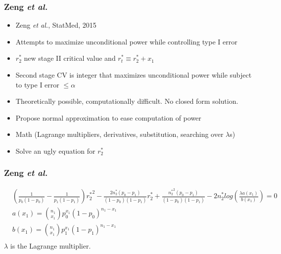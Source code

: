 \documentclass{beamer}\usepackage[]{graphicx}\usepackage[]{color}
\begin{document}
\begin{frame}
\frametitle{Zeng \textit{et al.}}
    \begin{itemize}
        \item Zeng \textit{et al.}, StatMed, 2015
        \item Attempts to maximize unconditional power while controlling type I error %
        \item $r_2^\ast$ new stage II critical value and $r_t^\ast \equiv r_2^\ast + x_1$ %
        \item Second stage CV is integer that maximizes unconditional power while subject to type I error $\leq \alpha$
        \item Theoretically possible, computationally difficult. No closed form solution.
        \item Propose normal approximation to ease computation of power
        \item Math (Lagrange multipliers, derivatives, substitution, searching over $\lambda$s)
        \item Solve an ugly equation for $r_2^\ast$
    \end{itemize}
\end{frame}

\begin{frame}
\frametitle{Zeng \textit{et al.}}
\tiny
\begin{equation}
\begin{aligned}
& \left(\frac{1}{p_0(1-p_0)} - \frac{1}{p_1(1-p_1)} \right) {r_2^\ast}^2 - \frac{2 n_2^\ast (p_0 - p_1)}{(1-p_0)(1-p_1)}r_2^\ast + \frac{{n_2^\ast}^2(p_0-p_1)}{(1-p_0)(1-p_1)}-2n_2^\ast log \left(\frac{\lambda a(x_1)}{b(x_1)}\right) = 0 \\
& a(x_1) = {n_1 \choose x_1} p_0^{x_1} (1-p_0)^{n_1-x_1} \\
& b(x_1) = {n_1 \choose x_1} p_1^{x_1} (1-p_1)^{n_1-x_1} \\ 
\end{aligned}
\end{equation}
\normalsize
$\lambda$ is the Lagrange multiplier.
\end{frame}
\end{document}
